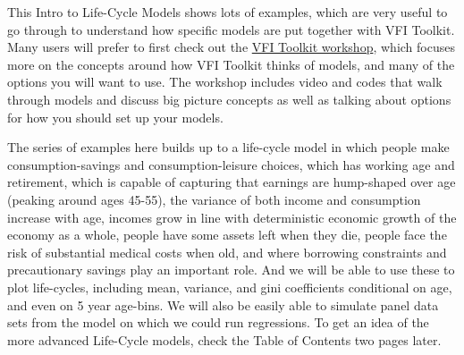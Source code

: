 \documentclass[11pt]{article}%
\begin{document}
This Intro to Life-Cycle Models shows lots of examples, which are very useful to go through to understand how specific models are put together with VFI Toolkit. Many users will prefer to first check out the \href{https://www.vfitoolkit.com/2025-workshop-lse/}{VFI Toolkit workshop}, which focuses more on the concepts around how VFI Toolkit thinks of models, and many of the options you will want to use. The workshop includes video and codes that walk through models and discuss big picture concepts as well as talking about options for how you should set up your models.

The series of examples here builds up to a life-cycle model in which people make consumption-savings and consumption-leisure choices, which has working age and retirement, which is capable of capturing that earnings are hump-shaped over age (peaking around ages 45-55), the variance of both income and consumption increase with age, incomes grow in line with deterministic economic growth of the economy as a whole, people have some assets left when they die, people face the risk of substantial medical costs when old, and where borrowing constraints and precautionary savings play an important role. And we will be able to use these to plot life-cycles, including mean, variance, and gini coefficients conditional on age, and even on 5 year age-bins. We will also be easily able to simulate panel data sets from the model on which we could run regressions. To get an idea of the more advanced Life-Cycle models, check the Table of Contents two pages later.
\end{document}
